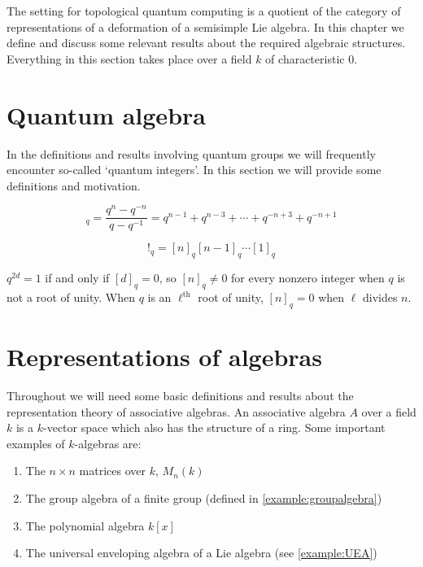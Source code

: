 The setting for topological quantum computing is a quotient of the category of
representations of a deformation of a semisimple Lie algebra. In this chapter
we define and discuss some relevant results about the required algebraic
structures. Everything in this section takes place over a field $k$ of
characteristic 0.

\section{Quantum algebra}

In the definitions and results involving quantum groups we will frequently
encounter so-called `quantum integers'. In this section we will provide some
definitions and motivation.

\begin{equation}
    [n]_q = \frac{q^n - q^{-n}}{q - q^{-1}} = q^{n-1} + q^{n-3} + \cdots + q^{-n+3} + q^{-n+1}
\end{equation}

\begin{equation}
    [n]!_q = [n]_q [n-1]_q \cdots [1]_q
\end{equation}

$q^{2d}=1$ if and only if $[d]_q = 0$, so $[n]_q \neq 0$ for every nonzero
integer when $q$ is not a root of unity. When $q$ is an $\ell^\text{th}$ root
of unity, $[n]_q = 0$ when $\ell$ divides $n$.


\section{Representations of algebras}

Throughout we will need some basic definitions and results about the
representation theory of associative algebras. An associative algebra $A$ over
a field $k$ is a $k$-vector space which also has the structure of a ring. Some
important examples of $k$-algebras are: 

\begin{enumerate}
    \item The $n \times n$ matrices over $k$, $M_n(k)$
    \item The group algebra of a finite group (defined in \ref{example:groupalgebra})
    \item The polynomial algebra $k[x]$
    \item The universal enveloping algebra of a Lie algebra (see \ref{example:UEA})
\end{enumerate}

